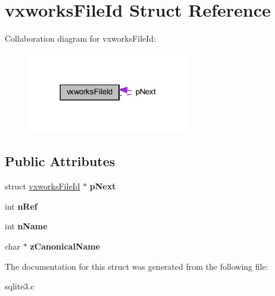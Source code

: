 \hypertarget{structvxworks_file_id}{\section{vxworks\-File\-Id Struct Reference}
\label{structvxworks_file_id}
}


Collaboration diagram for vxworks\-File\-Id\-:\nopagebreak
\begin{figure}[H]
\begin{center}
\leavevmode
\includegraphics[width=201pt]{structvxworks_file_id__coll__graph}
\end{center}
\end{figure}
\subsection*{Public Attributes}
\begin{DoxyCompactItemize}
\item 
\hypertarget{structvxworks_file_id_a1941104384e7aa1ad9d8574d091abe3a}{struct \hyperlink{structvxworks_file_id}{vxworks\-File\-Id} $\ast$ {\bfseries p\-Next}}\label{structvxworks_file_id_a1941104384e7aa1ad9d8574d091abe3a}

\item 
\hypertarget{structvxworks_file_id_a59dde49ee027786a06de8ad59b1d7883}{int {\bfseries n\-Ref}}\label{structvxworks_file_id_a59dde49ee027786a06de8ad59b1d7883}

\item 
\hypertarget{structvxworks_file_id_af7ed9a749d73b74b534bc06baf1abf6d}{int {\bfseries n\-Name}}\label{structvxworks_file_id_af7ed9a749d73b74b534bc06baf1abf6d}

\item 
\hypertarget{structvxworks_file_id_a032c9aaaa13ff100d9f3cd53926587fe}{char $\ast$ {\bfseries z\-Canonical\-Name}}\label{structvxworks_file_id_a032c9aaaa13ff100d9f3cd53926587fe}

\end{DoxyCompactItemize}


The documentation for this struct was generated from the following file\-:\begin{DoxyCompactItemize}
\item 
sqlite3.\-c\end{DoxyCompactItemize}
